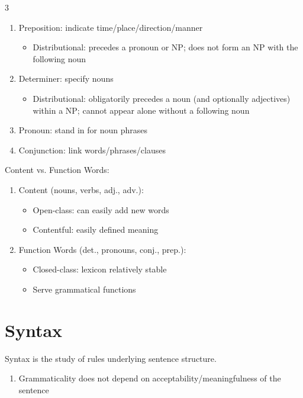 \documentclass[12pt, a4paper]{article}
\begin{document}
\begin{multicols*}{3}
\begin{enumerate}[\roman*.]
  \item Preposition: indicate time/place/direction/manner
    \begin{itemize}[leftmargin=*]\vspace{3pt}
      \item Distributional: precedes a pronoun or NP; does not form an NP with the following noun
    \end{itemize}
  \item Determiner: specify nouns
    \begin{itemize}[leftmargin=*]\vspace{3pt}
      \item Distributional: obligatorily precedes a noun (and optionally adjectives) within a NP; cannot appear alone without a following noun
    \end{itemize}
  \item Pronoun: stand in for noun phrases
  \item Conjunction: link words/phrases/clauses
\end{enumerate}

Content vs. Function Words:
\begin{enumerate}[\roman*.]
  \item Content (nouns, verbs, adj., adv.):
    \begin{itemize}[leftmargin=*]\vspace{3pt}
      \item Open-class: can easily add new words 
      \item Contentful: easily defined meaning
    \end{itemize}
  \item Function Words (det., pronouns, conj., prep.):
    \begin{itemize}[leftmargin=*]\vspace{3pt}
      \item Closed-class: lexicon relatively stable
      \item Serve grammatical functions
    \end{itemize}
\end{enumerate}
\vspace{-1em}
\colbreak
\section{Syntax}
Syntax is the study of rules underlying sentence structure.
\begin{enumerate}[\roman*.]
  \item Grammaticality does not depend on acceptability/meaningfulness of the sentence
\end{enumerate}


\end{multicols*}
\end{document}
